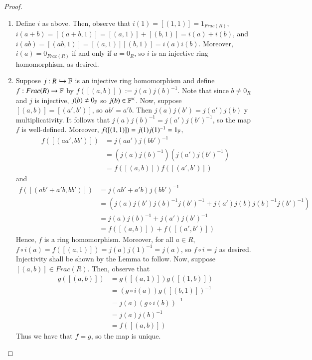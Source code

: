 \documentclass[12pt, a4paper, oneside, openright, titlepage]{book}
\begin{document}
\begin{proof}
    \begin{enumerate}
        \item Define $i$ as above. Then, observe that $i(1) = [(1,1)] = 1_{Frac(R)}$, $i(a+b) = [(a+b,1)] = [(a,1)] + [(b,1)] = i(a) + i(b)$, and $i(ab) = [(ab,1)] = [(a,1)][(b,1)] = i(a)i(b)$. Moreover, $i(a) = 0_{Frac(R)}$ if and only if $a = 0_R$, so $i$ is an injective ring homomorphism, as desired.
        \item Suppose $j:R\hookrightarrow \mathbb F$ is an injective ring homomorphism and define $f:Frac(R) \rightarrow \mathbb F$ by $f([(a,b)]) := j(a)j(b)^{-1}$. Note that since $b \neq 0_R$ and $j$ is injective, $j(b) \neq 0_{\mathbb F}$ so $j(b) \in \mathbb F^{\times}$. Now, suppose $[(a,b)] = [(a',b')]$, so $ab' = a'b$. Then $j(a)j(b') = j(a')j(b)$ y multiplicativity. It follows that $j(a)j(b)^{-1} = j(a')j(b')^{-1}$, so the map $f$ is well-defined. Moreover, $f([(1,1)]) = j(1)j(1)^{-1} = 1_{\mathbb F}$, \begin{align*}
            f([(aa',bb')]) &= j(aa')j(bb')^{-1} \\
            &= (j(a)j(b)^{-1})(j(a')j(b')^{-1}) \\
            &= f([(a,b)])f([(a',b')])
        \end{align*}
        and \begin{align*}
            f([(ab' + a'b,bb')]) &= j(ab'+a'b)j(bb')^{-1} \\
            &= (j(a)j(b')j(b)^{-1}j(b')^{-1}+j(a')j(b)j(b)^{-1}j(b')^{-1}) \\
            &= j(a)j(b)^{-1} + j(a')j(b')^{-1} \\
            &= f([(a,b)])+f([(a',b')])
        \end{align*}
        Hence, $f$ is a ring homomorphism. Moreover, for all $a \in R$, $f\circ i(a) = f([(a,1)]) = j(a)j(1)^{-1} = j(a)$, so $f\circ i = j$ as desired. Injectivity shall be shown by the Lemma to follow. Now, suppose $[(a,b)] \in Frac(R)$. Then, observe that \begin{align*}
            g([(a,b)]) &= g([(a,1)])g([(1,b)]) \tag{by multiplicativity} \\
            &= (g\circ i(a))g([(b,1)])^{-1} \tag{by multiplicativity and $b \neq 0$} \\
            &= j(a)(g\circ i(b))^{-1} \\
            &= j(a)j(b)^{-1} \\
            &= f([(a,b)]) \tag{by definition}
        \end{align*}
        Thus we have that $f = g$, so the map is unique.
    \end{enumerate}
\end{proof}
\end{document}
